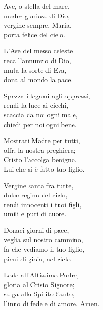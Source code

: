 
\strofa Ave, o stella del mare,\\
madre gloriosa di Dio,\\
vergine sempre, Maria,\\
porta felice del cielo.

\spazio

\strofa L'Ave del messo celeste\\
reca l'annunzio di Dio,\\
muta la sorte di Eva,\\
dona al mondo la pace.

\spazio

\strofa Spezza i legami agli oppressi,\\
rendi la luce ai ciechi,\\
scaccia da noi ogni male,\\
chiedi per noi ogni bene.

\spazio

\strofa Mostrati Madre per tutti,\\
offri la nostra preghiera;\\
Cristo l'accolga benigno,\\
Lui che si è fatto tuo figlio.

\spazio

\strofa Vergine santa fra tutte,\\
dolce regina del cielo,\\
rendi innocenti i tuoi figli,\\
umili e puri di cuore.

\spazio

\strofa Donaci giorni di pace,\\
veglia sul nostro cammino,\\
fa che vediamo il tuo figlio,\\
pieni di gioia, nel cielo.

\spazio

\strofa Lode all'Altissimo Padre,\\
gloria al Cristo Signore;\\
salga allo Spirito Santo,\\
l'inno di fede e di amore. Amen.